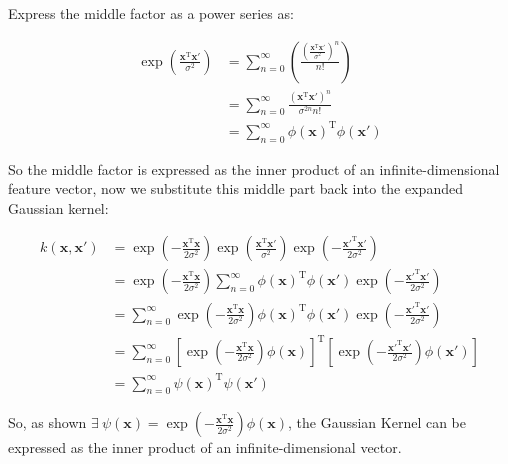 \documentclass[twoside,11pt]{homework}
\newcommand{\vect}[1]{\boldsymbol{\mathbf{#1}}}
\begin{document}
Express the middle factor as a power series as:

\begin{align*}
\exp \left( \frac{\vect{x} ^\mathrm{T} \vect{x}'}{\sigma ^2} \right)
&= \sum_{n=0}^{\infty} \left( \frac{\left( \frac{\vect{x} ^\mathrm{T} \vect{x}'}{\sigma ^2} \right)^n}{n!} \right) \\
&= \sum_{n=0}^{\infty}  \frac{(\vect{x} ^\mathrm{T} \vect{x}')^n} {\sigma ^{2n} n!} \\
&= \sum_{n=0}^{\infty}  \phi (\vect{x}) ^\mathrm{T} \phi (\vect{x'})
\end{align*}

So the middle factor is expressed as the inner product of an infinite-dimensional feature vector, now we substitute this middle part back into the expanded Gaussian kernel:

\begin{align*}
k(\vect{x}, \vect{x'})
&= \exp \left( - \frac{\vect{x} ^\mathrm{T} \vect{x}}{2\sigma ^2} \right) \exp \left( \frac{\vect{x} ^\mathrm{T} \vect{x}'}{\sigma ^2} \right) \exp \left( - \frac{\vect{x'} ^\mathrm{T} \vect{x}'}{2\sigma ^2} \right) \\
&= \exp \left( - \frac{\vect{x} ^\mathrm{T} \vect{x}}{2\sigma ^2} \right) \sum_{n=0}^{\infty}  \phi (\vect{x}) ^\mathrm{T} \phi (\vect{x'}) \exp \left( - \frac{\vect{x'} ^\mathrm{T} \vect{x}'}{2\sigma ^2} \right) \\
&=  \sum_{n=0}^{\infty}  \exp \left( - \frac{\vect{x} ^\mathrm{T} \vect{x}}{2\sigma ^2} \right)\phi (\vect{x}) ^\mathrm{T} \phi (\vect{x'}) \exp \left( - \frac{\vect{x'} ^\mathrm{T} \vect{x}'}{2\sigma ^2} \right) \\
&=  \sum_{n=0}^{\infty} \left[  \exp \left( - \frac{\vect{x} ^\mathrm{T} \vect{x}}{2\sigma ^2} \right)\phi (\vect{x}) \right] ^\mathrm{T} \left[  \exp \left( - \frac{\vect{x'} ^\mathrm{T} \vect{x}'}{2\sigma ^2} \right) \phi (\vect{x'}) \right] \\
&= \sum_{n=0}^{\infty}  \psi (\vect{x}) ^\mathrm{T} \psi (\vect{x'})
\end{align*}

So, as shown $ \exists  \ \psi (\vect{x})  = \exp \left( - \frac{\vect{x} ^\mathrm{T} \vect{x}}{2\sigma ^2} \right)\phi (\vect{x}) $, the Gaussian Kernel can be expressed as the inner product of an infinite-dimensional vector.





	
\end{document}
